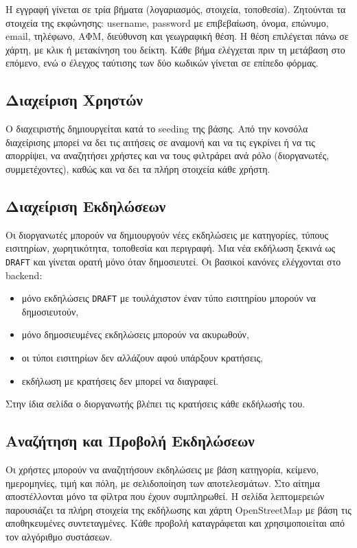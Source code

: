 \documentclass[11pt,a4paper]{article}
\newcommand{\code}[1]{\texttt{#1}}
\begin{document}
Η εγγραφή γίνεται σε τρία βήματα (λογαριασμός, στοιχεία, τοποθεσία). Ζητούνται τα
στοιχεία της εκφώνησης: username, password με επιβεβαίωση, όνομα, επώνυμο, email,
τηλέφωνο, ΑΦΜ, διεύθυνση και γεωγραφική θέση. Η θέση επιλέγεται πάνω σε χάρτη, με κλικ
ή μετακίνηση του δείκτη. Κάθε βήμα ελέγχεται πριν τη μετάβαση στο επόμενο, ενώ ο
έλεγχος ταύτισης των δύο κωδικών γίνεται σε επίπεδο φόρμας.

\subsection{Διαχείριση Χρηστών}

Ο διαχειριστής δημιουργείται κατά το seeding της βάσης. Από την κονσόλα διαχείρισης
μπορεί να δει τις αιτήσεις σε αναμονή και να τις εγκρίνει ή να τις απορρίψει, να
αναζητήσει χρήστες και να τους φιλτράρει ανά ρόλο (διοργανωτές, συμμετέχοντες), καθώς
και να δει τα πλήρη στοιχεία κάθε χρήστη.

\subsection{Διαχείριση Εκδηλώσεων}

Οι διοργανωτές μπορούν να δημιουργούν νέες εκδηλώσεις με κατηγορίες, τύπους
εισιτηρίων, χωρητικότητα, τοποθεσία και περιγραφή. Μια νέα εκδήλωση ξεκινά ως
\code{DRAFT} και γίνεται ορατή μόνο όταν δημοσιευτεί. Οι βασικοί κανόνες ελέγχονται στο
backend:
\begin{itemize}
  \item μόνο εκδηλώσεις \code{DRAFT} με τουλάχιστον έναν τύπο εισιτηρίου μπορούν να
    δημοσιευτούν,
  \item μόνο δημοσιευμένες εκδηλώσεις μπορούν να ακυρωθούν,
  \item οι τύποι εισιτηρίων δεν αλλάζουν αφού υπάρξουν κρατήσεις,
  \item εκδήλωση με κρατήσεις δεν μπορεί να διαγραφεί.
\end{itemize}

Στην ίδια σελίδα ο διοργανωτής βλέπει τις κρατήσεις κάθε εκδήλωσής του.

\subsection{Αναζήτηση και Προβολή Εκδηλώσεων}

Οι χρήστες μπορούν να αναζητήσουν εκδηλώσεις με βάση κατηγορία, κείμενο, ημερομηνίες,
τιμή και πόλη, με σελιδοποίηση των αποτελεσμάτων. Στο αίτημα αποστέλλονται μόνο τα
φίλτρα που έχουν συμπληρωθεί. Η σελίδα λεπτομερειών παρουσιάζει τα πλήρη στοιχεία της
εκδήλωσης και χάρτη OpenStreetMap με βάση τις αποθηκευμένες συντεταγμένες. Κάθε
προβολή καταγράφεται και χρησιμοποιείται από τον αλγόριθμο συστάσεων.
\end{document}
